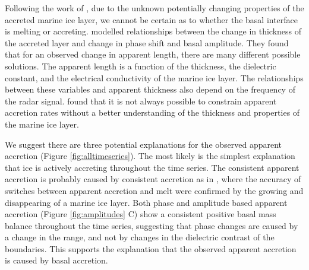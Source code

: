 Following the work of \cite{vavnkova2021nature}, due to the unknown potentially changing properties of the accreted marine ice layer, we cannot be certain as to whether the basal interface is melting or accreting. 
\cite{vavnkova2021nature} modelled relationships between the change in thickness of the accreted layer and change in phase shift and basal amplitude.  They found that for an observed change in apparent length, there are many different possible solutions. The apparent length is a function of the thickness, the dielectric constant, and the electrical conductivity of the marine ice layer. The relationships between these variables and apparent thickness also depend on the frequency of the radar signal. \cite{vavnkova2021nature} found that it is not always possible to constrain apparent accretion rates without a better understanding of the thickness and properties of the marine ice layer.


We suggest there are three potential explanations for the observed apparent accretion (Figure \ref{fig:alltimeseries}). 
The most likely is the simplest explanation that ice is actively accreting throughout the time series. The consistent apparent accretion is probably caused by consistent accretion as in \cite{vavnkova2021nature}, where the accuracy of switches between apparent accretion and melt were confirmed by the growing and disappearing of a marine ice layer. Both phase and amplitude based apparent accretion (Figure \ref{fig:amplitudes} C) show a consistent positive basal mass balance throughout the time series, suggesting that phase changes are caused by a change in the range, and not by changes in the dielectric contrast of the boundaries. This supports the explanation that the observed apparent accretion is caused by basal accretion.

